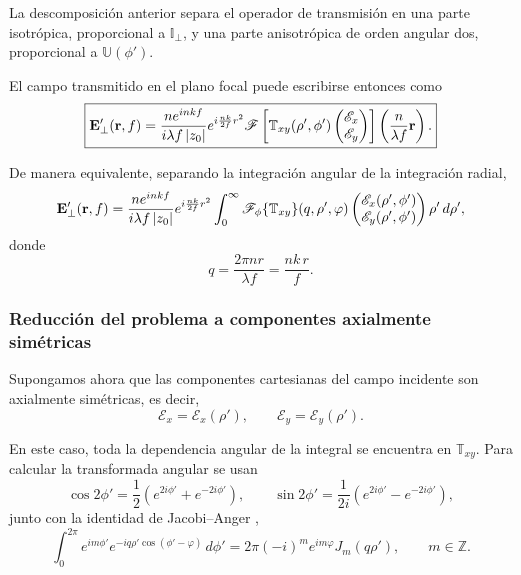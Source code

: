 La descomposición anterior separa el operador de transmisión en una parte
isotrópica, proporcional a $\mathbb I_\perp$, y una parte anisotrópica de
orden angular dos, proporcional a $\mathbb U(\phi')$.

El campo transmitido en el plano focal puede escribirse entonces como
\begin{equation}
\boxed{
\vb E'_\perp(\vb r,f)
=
\frac{n e^{inkf}}{i\lambda f\,|z_0|}
e^{i\frac{nk}{2f}r^2}
\mathscr F
\left[
\mathbb T_{xy}(\rho',\phi')
\begin{pmatrix}
\mathscr E_x\\
\mathscr E_y
\end{pmatrix}
\right]
\left(
\frac{n}{\lambda f}\vb r
\right).
}
\label{eq:E_prime_cartesian_general_Fourier}
\end{equation}

De manera equivalente, separando la integración angular de la integración radial,
\begin{equation}
\vb E'_\perp(\vb r,f)
=
\frac{n e^{inkf}}{i\lambda f\,|z_0|}
e^{i\frac{nk}{2f}r^2}
\int_0^\infty
\mathscr F_\phi\{\mathbb T_{xy}\}
(q,\rho',\varphi)
\begin{pmatrix}
\mathscr E_x(\rho',\phi')\\
\mathscr E_y(\rho',\phi')
\end{pmatrix}
\rho'\,d\rho',
\label{eq:E_prime_cartesian_general_radial_integral}
\end{equation}
donde
\begin{equation}
  q
  =
  \frac{2\pi n r}{\lambda f}
  =
  \frac{nk\,r}{f}.
\label{eq:q_cartesian_def}
\end{equation}

\subsubsection{Reducción del problema a componentes axialmente simétricas}

Supongamos ahora que las componentes cartesianas del campo incidente son
axialmente simétricas, es decir,
\begin{equation}
  \mathscr E_x
  =
  \mathscr E_x(\rho'),
  \qquad
  \mathscr E_y
  =
  \mathscr E_y(\rho').
\label{eq:cartesian_axial_symmetry_assumption}
\end{equation}

En este caso, toda la dependencia angular de la integral se encuentra en
$\mathbb T_{xy}$. Para calcular la transformada angular se usan
\begin{equation}
  \cos2\phi'
  =
  \frac{1}{2}
  \left(
  e^{2i\phi'}
  +
  e^{-2i\phi'}
  \right),
  \qquad
  \sin2\phi'
  =
  \frac{1}{2i}
  \left(
  e^{2i\phi'}
  -
  e^{-2i\phi'}
  \right),
\end{equation}
junto con la identidad de Jacobi--Anger \cite{Watson1944},
\begin{equation}
\int_0^{2\pi}
e^{im\phi'}
e^{-iq\rho'\cos(\phi'-\varphi)}
\,d\phi'
=
2\pi(-i)^m e^{im\varphi}J_m(q\rho'),
\qquad
m\in\mathbb Z.
\label{eq:jacobi_anger_cartesian_use}
\end{equation}

